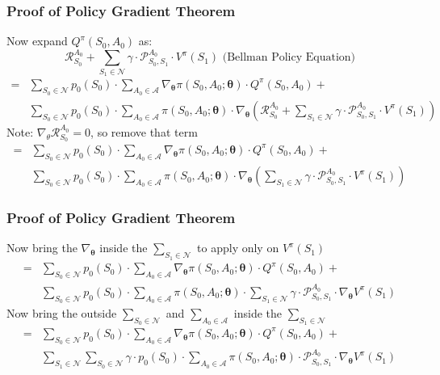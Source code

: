 \documentclass[handout]{beamer}
\begin{document}
\begin{frame}
\frametitle{Proof of Policy Gradient Theorem}
\pause
Now expand $Q^{\pi}(S_0, A_0)$ as:
$$\mathcal{R}_{S_0}^{A_0} + \sum_{S_1 \in \mathcal{N}} \gamma \cdot \mathcal{P}_{S_0, S_1}^{A_0} \cdot V^{\pi}(S_1) \mbox{ (Bellman Policy Equation)}$$
\pause
\begin{align*} 
= & \sum_{S_0 \in \mathcal{N}} p_0(S_0) \cdot \sum_{A_0 \in \mathcal{A}} \nabla_{\bm{\theta}} \pi(S_0, A_0; \bm{\theta}) \cdot Q^{\pi}(S_0, A_0) + \\
& \sum_{S_0 \in \mathcal{N}} p_0(S_0) \cdot \sum_{A_0 \in \mathcal{A}} \pi(S_0, A_0; \bm{\theta}) \cdot \nabla_{\bm{\theta}} (\mathcal{R}_{S_0}^{A_0} + \sum_{S_1 \in \mathcal{N}} \gamma \cdot  \mathcal{P}_{S_0,S_1}^{A_0} \cdot V^{\pi}(S_1))
\end{align*}
\pause
Note: $\nabla_{\theta} \mathcal{R}_{S_0}^{A_0} = 0$, so remove that term
\pause
\begin{align*}
= & \sum_{S_0 \in \mathcal{N}} p_0(S_0) \cdot \sum_{A_0 \in \mathcal{A}} \nabla_{\bm{\theta}} \pi(S_0, A_0; \bm{\theta}) \cdot Q^{\pi}(S_0, A_0) + \\
& \sum_{S_0 \in \mathcal{N}} p_0(S_0) \cdot \sum_{A_0 \in \mathcal{A}} \pi(S_0, A_0; \bm{\theta}) \cdot \nabla_{\bm{\theta}} (\sum_{S_1 \in \mathcal{N}} \gamma \cdot \mathcal{P}_{S_0,S_1}^{A_0} \cdot V^{\pi}(S_1))
\end{align*}
\end{frame}

\begin{frame}
\frametitle{Proof of Policy Gradient Theorem}
\pause
Now bring the $\nabla_{\bm{\theta}}$ inside the $\sum_{S_1 \in \mathcal{N}}$ to apply only on $V^{\pi}(S_1)$
\pause
\begin{align*}
= & \sum_{S_0 \in \mathcal{N}} p_0(S_0) \cdot \sum_{A_0 \in \mathcal{A}} \nabla_{\bm{\theta}} \pi(S_0, A_0; \bm{\theta}) \cdot Q^{\pi}(S_0, A_0) + \\
& \sum_{S_0 \in \mathcal{N}} p_0(S_0) \cdot \sum_{A_0 \in \mathcal{A}} \pi(S_0, A_0; \bm{\theta}) \cdot \sum_{S_1 \in \mathcal{N}} \gamma \cdot \mathcal{P}_{S_0,S_1}^{A_0} \cdot \nabla_{\bm{\theta}} V^{\pi}(S_1)
\end{align*}
\pause
Now bring the outside $\sum_{S_0 \in \mathcal{N}}$ and $\sum_{A_0 \in \mathcal{A}}$ inside the $\sum_{S_1 \in \mathcal{N}}$
\pause
\begin{align*}
= & \sum_{S_0 \in \mathcal{N}} p_0(S_0) \cdot \sum_{A_0 \in \mathcal{A}} \nabla_{\bm{\theta}} \pi(S_0, A_0; \bm{\theta}) \cdot Q^{\pi}(S_0, A_0) + \\
& \sum_{S_1 \in \mathcal{N}}  \sum_{S_0 \in \mathcal{N}} \gamma \cdot p_0(S_0) \cdot \sum_{A_0 \in \mathcal{A}} \pi(S_0, A_0; \bm{\theta}) \cdot \mathcal{P}_{S_0,S_1}^{A_0} \cdot \nabla_{\bm{\theta}}V^{\pi}(S_1)
\end{align*}
\end{frame}
\end{document}
